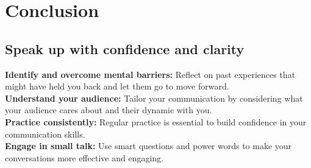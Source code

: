 \documentclass[12pt]{article}
\begin{document}
\section{Conclusion}

\subsection{Speak up with confidence and clarity}
\textbf{Identify and overcome mental barriers:}  Reflect on past experiences that might have held you back and let them go to move forward.\\
\textbf{Understand your audience:}  Tailor your communication by considering what your audience cares about and their dynamic with you.\\
\textbf{Practice consistently:} Regular practice is essential to build confidence in your communication skills.\\
\textbf{Engage in small talk:} Use smart questions and power words to make your conversations more effective and engaging.
\end{document}
